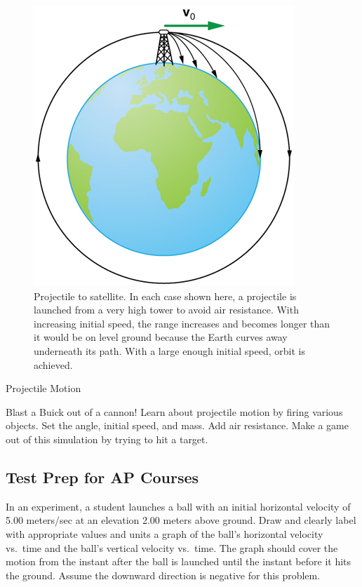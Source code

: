 \documentclass[
]{book}
\begin{document}
\begin{figure}
\hypertarget{import-auto-id1645881}{%
\centering
\includegraphics{images/Figure_03_04_06a.jpg}
\caption{Projectile to satellite. In each case shown here, a projectile is
launched from a very high tower to avoid air resistance. With increasing
initial speed, the range increases and becomes longer than it would be
on level ground because the Earth curves away underneath its path. With
a large enough initial speed, orbit is
achieved.}\label{import-auto-id1645881}
}
\end{figure}

\hypertarget{eip-89}{}
Projectile Motion

Blast a Buick out of a cannon! Learn about projectile motion by firing
various objects. Set the angle, initial speed, and mass. Add air
resistance. Make a game out of this simulation by trying to hit a
target.

\hypertarget{fs-id1167061400916}{}

\hypertarget{fs-id1619869}{}
\hypertarget{test-prep-for-ap-courses-8}{%
\subsection{Test Prep for AP Courses}\label{test-prep-for-ap-courses-8}}

\hypertarget{fs-id1316152}{}
\leavevmode{}%
In an experiment, a student launches a ball with an initial horizontal
velocity of 5.00 meters/sec at an elevation 2.00 meters above ground.
Draw and clearly label with appropriate values and units a graph of the
ball's horizontal velocity vs.~time and the ball's vertical velocity
vs.~time. The graph should cover the motion from the instant after the
ball is launched until the instant before it hits the ground. Assume the
downward direction is negative for this problem.
\end{document}
